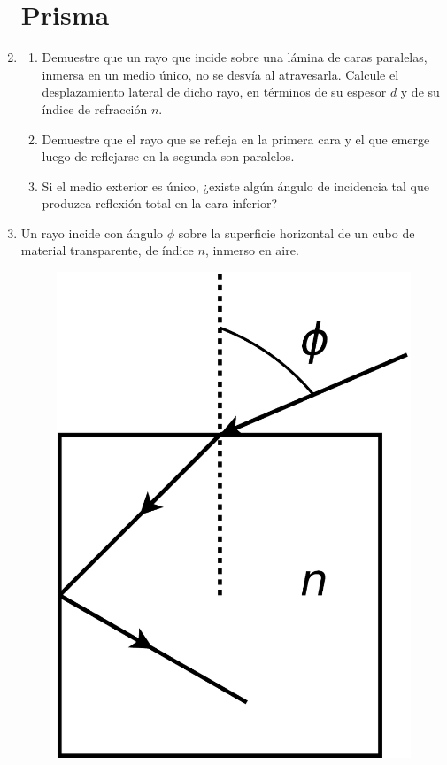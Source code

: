 \documentclass[11pt,spanish,a4paper]{article}
\begin{document}
\begin{enumerate}
\section*{Prisma}
\item  
\begin{enumerate}
\item Demuestre que un rayo que incide sobre una lámina de caras paralelas,
inmersa en un medio único, no se desvía al atravesarla. Calcule el
desplazamiento lateral de dicho rayo, en términos de su espesor $d$
y de su índice de refracción $n$.
\item Demuestre que el rayo que se refleja en la primera cara y el que emerge
luego de reflejarse en la segunda son paralelos.
\item Si el medio exterior es único, ¿existe algún ángulo de incidencia
tal que produzca reflexión total en la cara inferior?
\end{enumerate}
\item Un rayo incide con ángulo $\phi$ sobre la superficie horizontal de
un cubo de material transparente, de índice $n$, inmerso en aire.
\begin{figure}[H]
\centering{}\includegraphics[clip,scale=0.25]{ej3-5}
\end{figure}



\end{enumerate}
\end{document}
